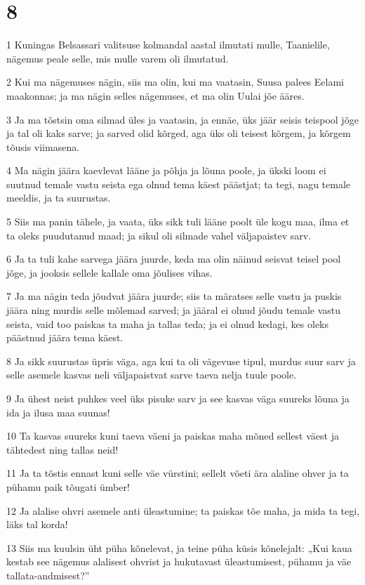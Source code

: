 \chapter{8}

\par 1 Kuningas Belsassari valitsuse kolmandal aastal ilmutati mulle, Taanielile, nägemus peale selle, mis mulle varem oli ilmutatud.
\par 2 Kui ma nägemuses nägin, siis ma olin, kui ma vaatasin, Suusa palees Eelami maakonnas; ja ma nägin selles nägemuses, et ma olin Uulai jõe ääres.
\par 3 Ja ma tõstsin oma silmad üles ja vaatasin, ja ennäe, üks jäär seisis teispool jõge ja tal oli kaks sarve; ja sarved olid kõrged, aga üks oli teisest kõrgem, ja kõrgem tõusis viimasena.
\par 4 Ma nägin jäära kaevlevat lääne ja põhja ja lõuna poole, ja ükski loom ei suutnud temale vastu seista ega olnud tema käest päästjat; ta tegi, nagu temale meeldis, ja ta suurustas.
\par 5 Siis ma panin tähele, ja vaata, üks sikk tuli lääne poolt üle kogu maa, ilma et ta oleks puudutanud maad; ja sikul oli silmade vahel väljapaistev sarv.
\par 6 Ja ta tuli kahe sarvega jäära juurde, keda ma olin näinud seisvat teisel pool jõge, ja jooksis sellele kallale oma jõulises vihas.
\par 7 Ja ma nägin teda jõudvat jäära juurde; siis ta märatses selle vastu ja puskis jäära ning murdis selle mõlemad sarved; ja jääral ei olnud jõudu temale vastu seista, vaid too paiskas ta maha ja tallas teda; ja ei olnud kedagi, kes oleks päästnud jäära tema käest.
\par 8 Ja sikk suurustas üpris väga, aga kui ta oli vägevuse tipul, murdus suur sarv ja selle asemele kasvas neli väljapaistvat sarve taeva nelja tuule poole.
\par 9 Ja ühest neist puhkes veel üks pisuke sarv ja see kasvas väga suureks lõuna ja ida ja ilusa maa suunas!
\par 10 Ta kasvas suureks kuni taeva väeni ja paiskas maha mõned sellest väest ja tähtedest ning tallas neid!
\par 11 Ja ta tõstis ennast kuni selle väe vürstini; sellelt võeti ära alaline ohver ja ta pühamu paik tõugati ümber!
\par 12 Ja alalise ohvri asemele anti üleastumine; ta paiskas tõe maha, ja mida ta tegi, läks tal korda!
\par 13 Siis ma kuulsin üht püha kõnelevat, ja teine püha küsis kõnelejalt: „Kui kaua kestab see nägemus alalisest ohvrist ja hukutavast üleastumisest, pühamu ja väe tallata-andmisest?”
